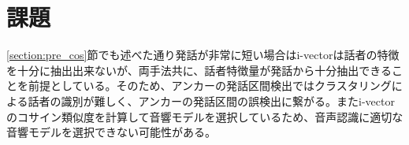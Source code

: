 \section{課題}
\ref{section:pre_cos}節でも述べた通り発話が非常に短い場合はi-vectorは話者の特徴を十分に抽出出来ないが、両手法共に、話者特徴量が発話から十分抽出できることを前提としている。そのため、アンカーの発話区間検出ではクラスタリングによる話者の識別が難しく、アンカーの発話区間の誤検出に繋がる。またi-vectorのコサイン類似度を計算して音響モデルを選択しているため、音声認識に適切な音響モデルを選択できない可能性がある。
